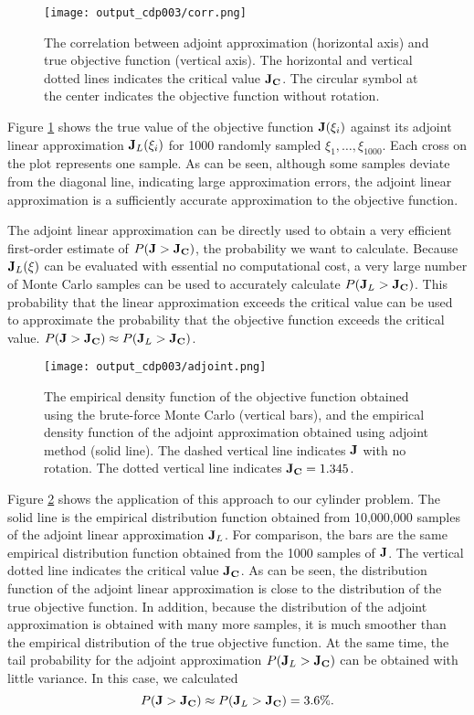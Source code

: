 \begin{figure}[htb!] \center
\texttt{[image: output\_cdp003/corr.png]}
\caption{The correlation between adjoint approximation (horizontal axis)
         and true objective function (vertical axis).
         The horizontal and vertical dotted lines indicates the critical
         value ${\bf J_C}$.
         The circular symbol at the center indicates the objective function
         without rotation.  }
\label{corr} 
\end{figure}
Figure \ref{corr} shows
the true value of the objective function ${\bf J}(\xi_i)$ against its
adjoint linear approximation ${\bf J}_L(\xi_i)$ for 1000 randomly sampled
$\xi_1, \ldots, \xi_{1000}$.  Each cross on the plot represents one sample.
As can be seen, although some
samples deviate from the diagonal line, indicating large approximation errors,
the adjoint linear approximation is a sufficiently accurate approximation to
the objective function.  

The adjoint linear
approximation can be directly used to obtain a very efficient first-order
estimate of $P({\bf J} > {\bf J_C})$, the probability we want to calculate.
Because ${\bf J}_L(\xi)$ can be evaluated
with essential no computational cost, a very large number of Monte Carlo
samples can be used to accurately calculate
$P({\bf J}_L > {\bf J_C})$.
This probability that the linear approximation exceeds the critical value can
be used to approximate the probability that the objective function exceeds the
critical value.
$P({\bf J} > {\bf J_C}) \approx P({\bf J}_L > {\bf J_C})$.

\begin{figure}[htb!] \center
\texttt{[image: output\_cdp003/adjoint.png]}
\caption{The empirical density function of the objective function obtained
         using the brute-force Monte Carlo (vertical bars), and the empirical
         density function of the adjoint approximation obtained using
         adjoint method (solid line).
         The dashed vertical line indicates ${\bf J}$ with no rotation.
         The dotted vertical line indicates ${\bf J_C} = 1.345$.}
 \label{hist}
\end{figure}
Figure \ref{hist} shows the application of this approach to our cylinder
problem.
The solid line is the empirical distribution function obtained from 10,000,000
samples of the adjoint linear approximation ${\bf J}_L$.
For comparison, the bars are the same empirical distribution function obtained
from the 1000 samples of $\bf J$.  The vertical dotted line indicates the
critical value ${\bf J_C}$.  As can be seen, the distribution
function of the adjoint linear approximation is close to the distribution of
the true objective function.  In addition, because the distribution
of the adjoint approximation is obtained with many more samples, it is much
smoother than the empirical distribution of the true objective function.
At the same time, the tail probability for the adjoint approximation
$P({\bf J}_L > {\bf J_C})$ can be obtained with little variance.
In this case, we calculated
\begin{equation} \label{result_adjoint_approx}
P({\bf J} > {\bf J_C}) \approx P({\bf J}_L > {\bf J_C}) = 3.6 \%.
\end{equation}

